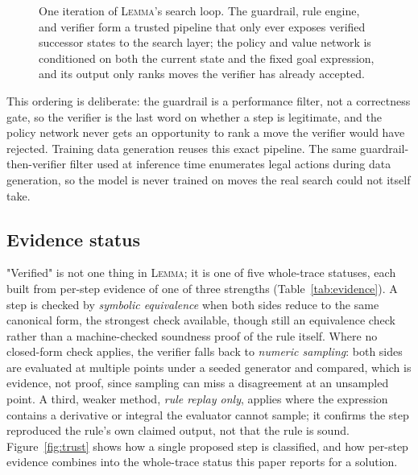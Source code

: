 \documentclass[11pt]{article}
\numberwithin{equation}{section}
\newcommand{\lemma}{\textsc{Lemma}}
\begin{document}
\begin{figure}[H]
{%
}
\caption{One iteration of \lemma{}'s search loop. The guardrail, rule engine, and verifier form a trusted pipeline that only ever exposes verified successor states to the search layer; the policy and value network is conditioned on both the current state and the fixed goal expression, and its output only ranks moves the verifier has already accepted.}
\label{fig:pipeline}
\end{figure}

This ordering is deliberate: the guardrail is a performance filter, not a correctness gate, so the verifier is the last word on whether a step is legitimate, and the policy network never gets an opportunity to rank a move the verifier would have rejected. Training data generation reuses this exact pipeline. The same guardrail-then-verifier filter used at inference time enumerates legal actions during data generation, so the model is never trained on moves the real search could not itself take.

\subsection{Evidence status}
\label{sec:evidence}

"Verified" is not one thing in \lemma{}; it is one of five whole-trace statuses, each built from per-step evidence of one of three strengths (Table~\ref{tab:evidence}). A step is checked by \emph{symbolic equivalence} when both sides reduce to the same canonical form, the strongest check available, though still an equivalence check rather than a machine-checked soundness proof of the rule itself. Where no closed-form check applies, the verifier falls back to \emph{numeric sampling}: both sides are evaluated at multiple points under a seeded generator and compared, which is evidence, not proof, since sampling can miss a disagreement at an unsampled point. A third, weaker method, \emph{rule replay only}, applies where the expression contains a derivative or integral the evaluator cannot sample; it confirms the step reproduced the rule's own claimed output, not that the rule is sound. Figure~\ref{fig:trust} shows how a single proposed step is classified, and how per-step evidence combines into the whole-trace status this paper reports for a solution.
\end{document}
